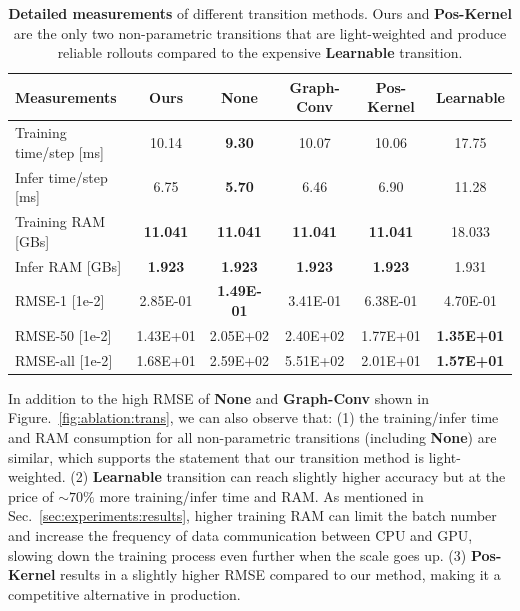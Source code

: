 \begin{table}[h]
    \centering
    \caption{\textbf{Detailed measurements} of different transition methods. Ours and \textbf{Pos-Kernel} are the only two non-parametric transitions that are light-weighted and produce reliable rollouts compared to the expensive \textbf{Learnable} transition.}\vspace{5pt}
    \begin{tabular}{lccccc}
        \textbf{Measurements}       & \textbf{Ours}   & \textbf{None}     & \textbf{Graph-Conv} & \textbf{Pos-Kernel} & \textbf{Learnable} \\ \hline
        Training time/step {[}ms{]} & 10.14           & \textbf{9.30}     & 10.07               & 10.06               & 17.75              \\
        Infer time/step {[}ms{]}    & 6.75            & \textbf{5.70}     & 6.46                & 6.90                & 11.28              \\
        Training RAM {[}GBs{]}      & \textbf{11.041} & \textbf{11.041}   & \textbf{11.041}     & \textbf{11.041}     & 18.033             \\
        Infer RAM {[}GBs{]}         & \textbf{1.923}  & \textbf{1.923}    & \textbf{1.923}      & \textbf{1.923}      & 1.931              \\
        RMSE-1 {[}1e-2{]}           & 2.85E-01        & \textbf{1.49E-01} & 3.41E-01            & 6.38E-01            & 4.70E-01           \\
        RMSE-50 {[}1e-2{]}          & 1.43E+01        & 2.05E+02          & 2.40E+02            & 1.77E+01            & \textbf{1.35E+01}  \\
        RMSE-all {[}1e-2{]}         & 1.68E+01        & 2.59E+02          & 5.51E+02            & 2.01E+01            & \textbf{1.57E+01}
    \end{tabular}
    \label{tab:detail:ram}
\end{table}

In addition to the high RMSE of \textbf{None} and \textbf{Graph-Conv} shown in Figure.~\ref{fig:ablation:trans}, we can also observe that: (1) the training/infer time and RAM consumption for all non-parametric transitions (including \textbf{None}) are similar, which supports the statement that our transition method is light-weighted. (2) \textbf{Learnable} transition can reach slightly higher accuracy but at the price of $\sim 70\%$ more training/infer time and RAM. As mentioned in Sec.~\ref{sec:experiments:results}, higher training RAM can limit the batch number and increase the frequency of data communication between CPU and GPU, slowing down the training process even further when the scale goes up. (3) \textbf{Pos-Kernel} results in a slightly higher RMSE compared to our method, making it a competitive alternative in production.

